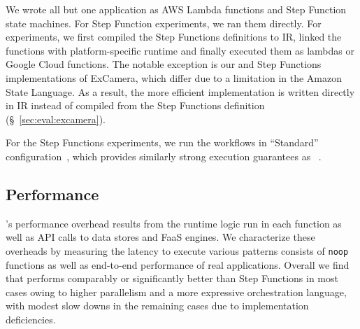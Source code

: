 We wrote all but one application as AWS Lambda functions and Step Function
state machines. For Step Function experiments, we ran them directly. For
\name{} experiments, we first compiled the Step Functions definitions to
\name{} IR, linked the functions with platform-specific runtime and finally
executed them as lambdas or Google Cloud functions. The notable exception is
our \name{} and Step Functions implementations of ExCamera, which differ due
to a limitation in the Amazon State Language. As a result, the more efficient
\name{} implementation is written directly in \name{} IR instead of compiled
from the Step Functions definition (\S~\ref{sec:eval:excamera}).

For the Step Functions experiments, we run the workflows in ``Standard''
configuration~\cite{aws-step-functions-standard-vs-express}, which provides
similarly strong execution guarantees as
\name{}~\cite{aws-step-functions-exec-gntee}.



\subsection{Performance}\label{sec:eval:micro}

\name{}'s performance overhead results from the \name{} runtime logic run in
each function as well as API calls to data stores and FaaS engines. We
characterize these overheads by measuring the latency to execute various
patterns consists of \texttt{noop} functions as well as end-to-end performance
of real applications. Overall we find that \name{} performs comparably or
significantly better than Step Functions in most cases owing to higher
parallelism and a more expressive orchestration language, with modest slow
downs in the remaining cases due to implementation deficiencies.

